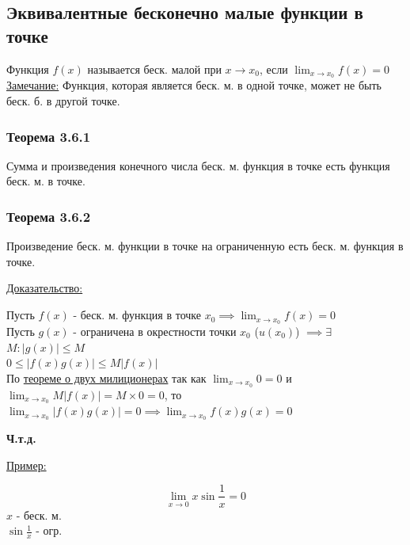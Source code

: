 \documentclass[12pt]{article}
\begin{document}
    \subsection{Эквивалентные бесконечно малые функции в точке}
    \noindent Функция $f(x)$ называется беск. малой при $x \to x_0$, если $\lim_{x \to x_0}f(x) = 0$\\
    \underline{Замечание:} Функция, которая является беск. м. в одной точке, может не быть беск. б. в другой точке.\par\noindent
    \subsubsection*{Теорема 3.6.1}\label{th:3.6.1}
    Сумма и произведения конечного числа беск. м. функция в точке есть функция беск. м. в точке.
    \subsubsection*{Теорема 3.6.2}\label{th:3.6.2}
    Произведение беск. м. функции в точке на ограниченную есть беск. м. функция в точке.\par\noindent
    \underline{Доказательство:}
    \begin{adjustwidth}{1.5em}{1.5em}
        Пусть $f(x)$ - беск. м. функция в точке $x_0 \implies \lim_{x\to x_0}f(x)=0$\\
        Пусть $g(x)$ - ограничена в окрестности точки $x_0$ ($u(x_0)$) $\implies \exists$ $M : |g(x)| \le M$\\
        $0 \le |f(x)g(x)| \le M|f(x)|$\\
        По \hyperref[th:2.2.5]{теореме о двух милиционерах} так как $\lim_{x\to x_0}0 = 0$ и $\lim_{x\to x_0}M|f(x)| = M \times 0 = 0$, то $\lim_{x\to x_0}|f(x)g(x)| = 0 \implies \lim_{x\to x_0}f(x)g(x) = 0$
        \begin{center}
            \textbf{Ч.т.д.}
        \end{center}
    \end{adjustwidth}
    \underline{Пример:}
    \begin{adjustwidth}{1.5em}{1.5em}
        \[\lim_{x\to0} x\sin \frac{1}{x} = 0\]
        $x$ - беск. м.\\
        $\sin \frac{1}{x}$ - огр.
    \end{adjustwidth}
\end{document}
